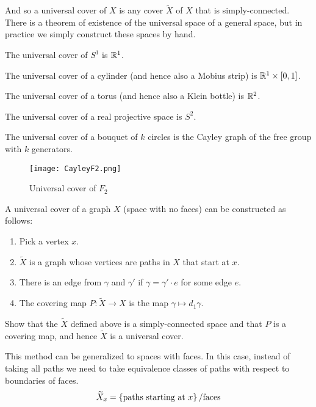 And so a universal cover of $X$ is any cover $\widetilde{X}$ of $X$ that is simply-connected.
There is a theorem of existence of the universal space of a general space, but in practice we simply construct these spaces by hand.

\begin{ex}
  The universal cover of $S^1$ is $\mathbb{R}^1$.
\end{ex}

\begin{ex}
  The universal cover of a cylinder (and hence also a Mobius strip) is $\mathbb{R}^1 \times [0,1]$.
\end{ex}

\begin{ex}
  The universal cover of a torus (and hence also a Klein bottle) is $\mathbb{R}^2$.
\end{ex}

\begin{ex}
  The universal cover of a real projective space is $S^2$.
\end{ex}

\begin{ex}
  The universal cover of a bouquet of $k$ circles is the Cayley graph of the free group with $k$ generators.
  \begin{figure}[H]
  \centering
    \texttt{[image: CayleyF2.png]}
    \caption{Universal cover of $F_2$}
  \end{figure}
\end{ex}

\begin{ex}
  A universal cover of a graph $X$ (space with no faces) can be constructed as follows:
  \begin{enumerate}
    \item Pick a vertex $x$.
    \item $\widetilde{X}$ is a graph whose vertices are paths in $X$ that start at $x$.
    \item There is an edge from $\gamma$ and $\gamma'$ if $\gamma = \gamma' \cdot e$ for some edge $e$.
    \item The covering map $P:\widetilde{X} \rightarrow X$ is the map $\gamma \mapsto d_1 \gamma$.
  \end{enumerate}
  \begin{qbox}
    Show that the $\widetilde{X}$ defined above is a simply-connected space and that $P$ is a covering map, and hence $\widetilde{X}$ is a universal cover.
  \end{qbox}
  This method can be generalized to spaces with faces. In this case, instead of taking all paths we need to take equivalence classes of paths with respect to boundaries of faces.
  \begin{equation*}
    \widetilde{X}_x = \left\{ \mbox{paths starting at } x\right\} / \mbox{faces}
  \end{equation*}
\end{ex}

